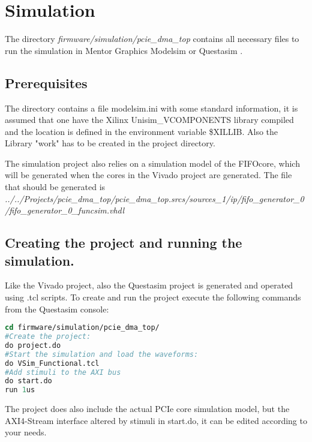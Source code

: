 \section{Simulation}
The directory \textit{firmware/simulation/pcie\_dma\_top} contains all necessary files to run the simulation in Mentor Graphics Modelsim or Questasim \cite{questasim}. 

\subsection{Prerequisites}
The directory contains a file modelsim.ini with some standard information, it is assumed that one have the Xilinx Unisim\_VCOMPONENTS library compiled and the location is defined in the environment variable \$XILLIB. Also the Library "work" has to be created in the project directory.

The simulation project also relies on a simulation model of the FIFOcore, which will be generated when the cores in the Vivado project are generated. The file that should be generated is \textit{../../Projects/pcie\_dma\_top/pcie\_dma\_top.srcs/sources\_1/ip/fifo\_generator\_0 /fifo\_generator\_0\_funcsim.vhdl}

\subsection{Creating the project and running the simulation.}
Like the Vivado project, also the Questasim project is generated and operated using .tcl scripts. To create and run the project execute the following commands from the Questasim console:
\begin{lstlisting}[language=tcl, frame=single, caption=Run the simulation]
cd firmware/simulation/pcie_dma_top/
#Create the project:
do project.do
#Start the simulation and load the waveforms:
do VSim_Functional.tcl
#Add stimuli to the AXI bus
do start.do
run 1us
\end{lstlisting}
The project does also include the actual PCIe core simulation model, but the AXI4-Stream interface altered by stimuli in start.do, it can be edited according to your needs.
\newpage
